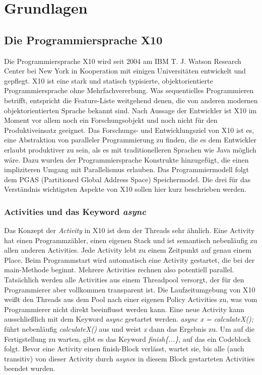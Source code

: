 \chapter{Grundlagen} %
\label{cha:grundlagen}

\section{Die Programmiersprache X10} %
\label{sec:die_programmiersprache_x10}
Die Programmiersprache X10 wird seit 2004 am IBM T. J. Watson Research Center bei New York in Kooperation mit einigen Universitäten entwickelt und gepflegt. X10 ist eine stark und statisch typisierte, objektorientierte Programmiersprache ohne Mehrfachvererbung. Was sequentielles Programmieren betrifft, entspricht die Feature-Liste weitgehend denen, die von anderen modernen objektorientierten Sprache bekannt sind. Nach Aussage der Entwickler ist X10 im Moment vor allem noch ein Forschungsobjekt und noch nicht für den Produktiveinsatz geeignet. Das Forschungs- und Entwicklungsziel von X10 ist es, eine Abstraktion von paralleler Programmierung zu finden, die es dem Entwickler erlaubt produktiver zu sein, als es mit traditionelleren Sprachen wie Java möglich wäre. Dazu wurden der Programmiersprache Konstrukte hinzugefügt, die einen impliziteren Umgang mit Parallelismus erlauben. Das Programmiermodell folgt dem PGAS (Partitioned Global Address Space) Speichermodel. Die drei für das Verständnis wichtigsten Aspekte von X10 sollen hier kurz beschrieben werden.\cite{x10FAQ:2012:Online}

\subsection{Activities und das Keyword \textit{async}}  %
\label{sub:aktivitaeten_und_das_keyword_async}
Das Konzept der \textit{Activity} in X10 ist dem der Threads sehr ähnlich. Eine Activity hat einen Programmzähler, einen eigenen Stack und ist semantisch nebenläufig zu allen anderen Activities. Jede Activity lebt zu einem Zeitpunkt auf genau einem Place. Beim Programmstart wird automatisch eine Activity gestartet, die bei der main-Methode beginnt. Mehrere Activities rechnen also potentiell parallel. Tatsächlich werden alle Activities aus einem Threadpool versorgt, der für den Programmierer aber vollkommen transparent ist. Die Laufzeitumgebung von X10 weißt den Threads aus dem Pool nach einer eigenen Policy Activities zu, was vom Programmierer nicht direkt beeinflusst werden kann. Eine neue Activity kann ausschließlich mit dem Keyword \textit{async} gestartet werden. \textit{ async x = calculateX();} führt nebenläufig \textit{calculateX()} aus und weist \textit{x} dann das Ergebnis zu. Um auf die Fertigstellung zu warten, gibt es das Keyword \textit{finish\{...\}}, auf das ein Codeblock folgt. Bevor eine Activity einen finish-Block verlässt, wartet sie, bis alle (auch transitiv) von dieser Activity durch \textit{async}s in diesem Block gestarteten Activities beendet wurden.\cite{x10Spec:2012:Online}

